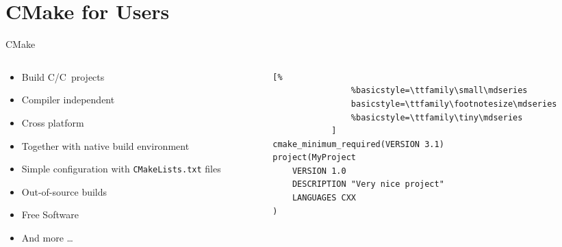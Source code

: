\documentclass[t]{beamer}
\def\CPP{{C\nolinebreak[4]\hspace{-.05em}\raisebox{.4ex}{\tiny\bf ++}}}
\begin{document}
\section{CMake for Users}


\begin{frame}[fragile]{CMake}
    \begin{columns}[T]
        \begin{column}{0.4\textwidth}
            \begin{itemize}
                \item Build C/\CPP\ projects
                \item Compiler independent
                \item Cross platform
                \item Together with native build environment
                \item Simple configuration with \texttt{CMakeLists.txt}
                    files
                \item Out-of-source builds
                \item Free Software
                \item And more …
            \end{itemize}
        \end{column}
        \begin{column}{0.6\textwidth}
            \begin{lstlisting}[%
                %basicstyle=\ttfamily\small\mdseries
                basicstyle=\ttfamily\footnotesize\mdseries
                %basicstyle=\ttfamily\tiny\mdseries
            ]
cmake_minimum_required(VERSION 3.1)
project(MyProject
    VERSION 1.0
    DESCRIPTION "Very nice project"
    LANGUAGES CXX
)
            \end{lstlisting}
        \end{column}
    \end{columns}
\end{frame}
\end{document}
